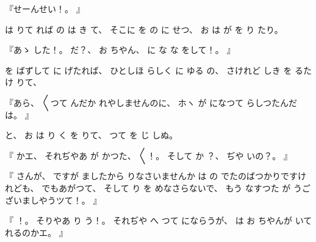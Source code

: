 
%
『せーんせい！。
』

%
は
りて
れば
の
は
き
て、
%
そこに
を
の
に
せつ、
%
お
は
が
を
り
たり。

%
『あゝ
した！。
%
だ{}？、
%
お
ちやん、
%
に
な
な
をして！。
』

%
を
ばずして
に
げたれば、
%
ひとしほ
らしく
に
ゆる
の、
%
さけれど
しき
を
るたけ
りて、

%
『あら、
%
〳〵つて
んだか
れやしませんのに、
%
ホヽ
が
になつて
らしつたんだは。
』

%
と、
%
お
は
り%
く
を
りて、
%
つて
を
じ
しぬ。

%
『
かエ、
%
それぢやあ
が
かつた、
%
〳〵！。%
%
そして
か
？、
%
ぢや
いの？。
』

%
『
さんが、
%
ですが
ましたから
りなさいませんか
は
の
でたのばつかりですけれども、
%
でもあがつて、
%
そして
り
を
めなさらないで、
%
もう
なすつた
が
うございましやうツて！。
』

%
『
！。
%
そりやあ
り
う！。
%
それぢや
へ
つて
にならうが、
%
は
お
ちやんが
いて
れるのかエ。
』

